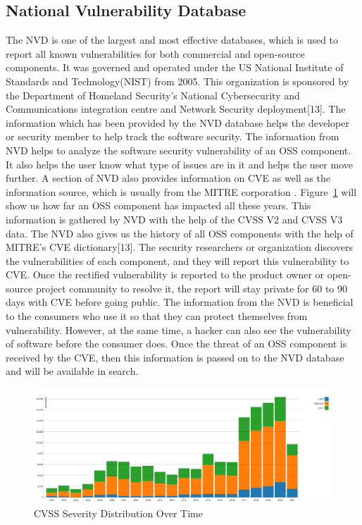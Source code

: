 \subsection{National Vulnerability Database}
The \acs{NVD} is one of the largest and most effective databases, which is used to report all known vulnerabilities for both commercial and open-source components. It was governed and operated under the US National Institute of Standards and Technology(NIST) from 2005. This organization is sponsored by the Department of Homeland Security's National Cybersecurity and Communications integration centre and Network Security deployment[13]. The information which has been provided by the \acs{NVD} database helps the developer or security member to help track the software security. The information from \acs{NVD} helps to analyze the software security vulnerability of an \acs{OSS} component. It also helps the user know what type of issues are in it and helps the user move further. A section of \acs{NVD} also provides information on \acs{CVE} as well as the information source, which is usually from the MITRE corporation \cite{TheNVD}. Figure~\ref{fig:vulgraph} will show us how far an \acs{OSS} component has impacted all these years. This information is gathered by \acs{NVD} with the help of the CVSS V2 and CVSS V3 data. The \acs{NVD} also gives us the history of all \acs{OSS} components with the help of MITRE’s \acs{CVE} dictionary[13]. The security researchers or organization discovers the vulnerabilities of each component, and they will report this vulnerability to CVE. Once the rectified vulnerability is reported to the product owner or open-source project community to resolve it, the report will stay private for 60 to 90 days with \acs{CVE} before going public. The information from the \acs{NVD} is beneficial to the consumers who use it so that they can protect themselves from vulnerability. However, at the same time, a hacker can also see the vulnerability of software before the consumer does. Once the threat of an \acs{OSS} component is received by the \acs{CVE}, then this information is passed on to the \acs{NVD} database and will be available in search.

\begin{figure}[h!]
	\includegraphics[width=15cm]{includes/vulgraph.PNG}
	\centering
	\caption{\acs{CVSS} Severity Distribution Over Time \cite{NVDgraph}}
	\label{fig:vulgraph}
\end{figure}
%
